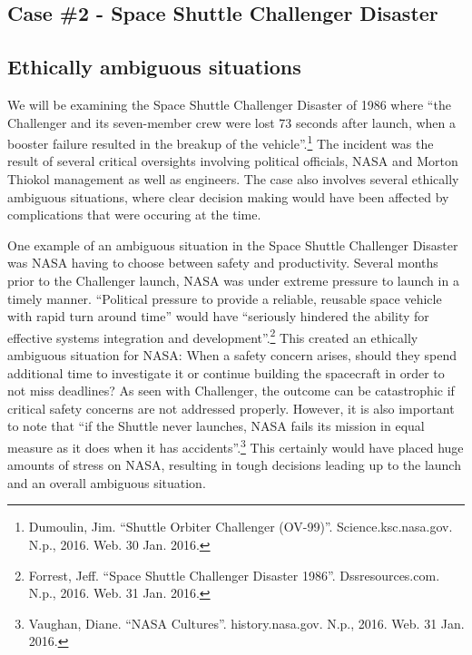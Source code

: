 \documentclass{article}
\newcommand{\q}[1]{``#1''}
\begin{document}
\begin{center}\section*{Case \#2 - Space Shuttle Challenger Disaster}\end{center}

\subsection{Ethically ambiguous situations}

We will be examining the Space Shuttle Challenger Disaster of 1986 where \q{the Challenger and its seven-member crew were lost 73 seconds after launch, when a booster failure resulted in the breakup of the vehicle}.\footnote{Dumoulin, Jim. \q{Shuttle Orbiter Challenger (OV-99)}. Science.ksc.nasa.gov. N.p., 2016. Web. 30 Jan. 2016.} The incident was the result of several critical oversights involving political officials, NASA and Morton Thiokol management as well as engineers. The case also involves several ethically ambiguous situations, where clear decision making would have been affected by complications that were occuring at the time. \par

One example of an ambiguous situation in the Space Shuttle Challenger Disaster was NASA having to choose between safety and productivity. Several months prior to the Challenger launch, NASA was under extreme pressure to launch in a timely manner. \q{Political pressure to provide a reliable, reusable space vehicle with rapid turn around time} would have \q{seriously hindered the ability for effective systems integration and development}.\footnote{Forrest, Jeff. \q{Space Shuttle Challenger Disaster 1986}. Dssresources.com. N.p., 2016. Web. 31 Jan. 2016.} This created an ethically ambiguous situation for NASA: When a safety concern arises, should they spend additional time to investigate it or continue building the spacecraft in order to not miss deadlines? As seen with Challenger, the outcome can be catastrophic if critical safety concerns are not addressed properly. However, it is also important to note that \q{if the Shuttle never launches, NASA fails its mission in equal measure as it does when it has accidents}.\footnote{Vaughan, Diane. \q{NASA Cultures}. history.nasa.gov. N.p., 2016. Web. 31 Jan. 2016.} This certainly would have placed huge amounts of stress on NASA, resulting in tough decisions leading up to the launch and an overall ambiguous situation. \par
\end{document}
